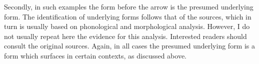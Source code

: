 Secondly, in such examples the form
before the arrow is the presumed underlying form.
The identification of underlying forms follows that of the sources,
which in turn is usually based on phonological and morphological analysis.
However, I do not usually repeat here the evidence for this analysis.
Interested readers should consult the original sources.
Again, in all cases the presumed underlying form
is a form which surfaces in certain contexts, as discussed above.